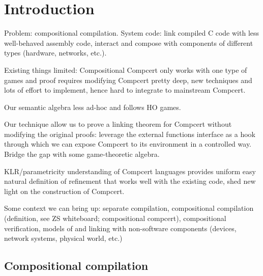 \documentclass[acmsmall,anonymous]{acmart}
\begin{document}
\section{Introduction} %

Problem:
compositional compilation.
System code:
link compiled C code with less well-behaved assembly code,
interact and compose with components of different types
(hardware, networks, etc.).

Existing things limited:
Compositional Compcert only works with one type of games
and proof requires modifying Compcert pretty deep,
new techniques and lots of effort to implement,
hence hard to integrate to mainstream Compcert.

Our semantic algebra less ad-hoc and follows HO games.

Our technique allow us to prove a linking theorem for Compcert
without modifying the original proofs:
leverage the external functions interface as a hook
through which we can expose Compcert to its environment in a controlled way.
Bridge the gap with some game-theoretic algebra.

KLR/parametricity understanding of Compcert languages provides
uniform easy natural definition of refinement
that works well with the existing code,
shed new light on the construction of Compcert.

Some context we can bring up:
separate compilation,
compositional compilation (definition, see ZS whiteboard; compositional compcert),
compositional verification,
models of and linking with non-software components
(devices, network systems, physical world, etc.)

\subsection{Compositional compilation}
\end{document}
